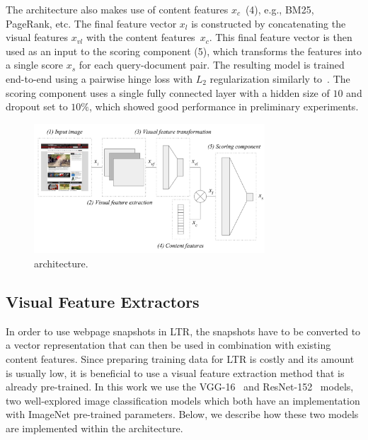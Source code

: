 The \modelname{} architecture also makes use of content features $x_{c}$~(4), e.g., BM25, PageRank, etc.
The final feature vector $x_{l}$ is constructed by concatenating the visual features $x_{vl}$ with the content features~$x_{c}$.
%
This final feature vector is then used as an input to the scoring component (5),
which transforms the features into a single score $x_s$ for each query-document pair.
The resulting model is trained end-to-end using a pairwise hinge loss with $L_2$ regularization similarly to~\cite{fan2017learning}.
The scoring component uses a single fully connected layer with a hidden size of $10$ and dropout set to $10\%$,
which showed good performance in preliminary experiments.



\begin{figure}[t]
\includegraphics[width = 3.4in]{images/multimodelarchitecture.pdf}
\caption{\modelname{} architecture.}
\label{fig:multimodelarchitecture}
\end{figure}

\subsection{Visual Feature Extractors} \label{sec:visualfeatures}
In order to use webpage snapshots in \ac{LTR}, the snapshots have to be converted to a vector representation that can then be used in combination with existing content features. 
Since preparing training data for \ac{LTR} is costly and its amount is usually low, it is beneficial to use a visual feature extraction method that is already pre-trained.
In this work we use the VGG-16~\cite{simonyan2014very} and ResNet-152~\cite{he2016deep} models, two well-explored image classification models which both have an implementation with ImageNet pre-trained parameters.
Below, we describe how these two models are implemented within the \modelname{} architecture.

